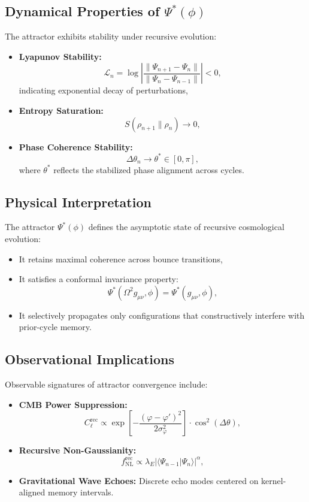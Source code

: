 \subsection{Dynamical Properties of \( \Psi^*(\phi) \)}

The attractor exhibits stability under recursive evolution:

\begin{itemize}
    \item \textbf{Lyapunov Stability:}
    \[
    \mathcal{L}_n = \log \left| \frac{\|\Psi_{n+1} - \Psi_n\|}{\|\Psi_n - \Psi_{n-1}\|} \right| < 0,
    \]
    indicating exponential decay of perturbations,
    \item \textbf{Entropy Saturation:}
    \[
    S(\rho_{n+1} \| \rho_n) \to 0,
    \]
    \item \textbf{Phase Coherence Stability:}
    \[
    \Delta \theta_n \to \theta^* \in [0, \pi],
    \]
    where \( \theta^* \) reflects the stabilized phase alignment across cycles.
\end{itemize}

\subsection{Physical Interpretation}

The attractor \( \Psi^*(\phi) \) defines the asymptotic state of recursive cosmological evolution:
\begin{itemize}
    \item It retains maximal coherence across bounce transitions,
    \item It satisfies a conformal invariance property:
    \[
    \Psi^*(\Omega^2 g_{\mu\nu}, \phi) = \Psi^*(g_{\mu\nu}, \phi),
    \]
    \item It selectively propagates only configurations that constructively interfere with prior-cycle memory.
\end{itemize}

\subsection{Observational Implications}

Observable signatures of attractor convergence include:

\begin{itemize}
    \item \textbf{CMB Power Suppression:}
    \[
    C_\ell^{\text{rec}} \propto \exp\left[-\frac{(\varphi - \varphi')^2}{2\sigma_\varphi^2}\right] \cdot \cos^2(\Delta \theta),
    \]
    \item \textbf{Recursive Non-Gaussianity:}
    \[
    f_{\text{NL}}^{\text{rec}} \propto \lambda_E |\langle \Psi_{n-1} | \Psi_n \rangle|^\alpha,
    \]
    \item \textbf{Gravitational Wave Echoes:}
    Discrete echo modes centered on kernel-aligned memory intervals.
\end{itemize}

